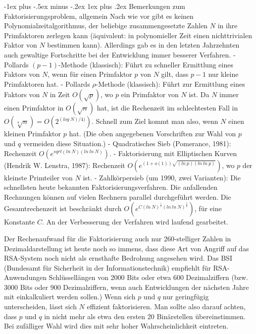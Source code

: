 \documentclass[a4paper]{article}
\makeatletter
\renewcommand{\subsubsection}{\@startsection{subsubsection}{3}{0mm}%
 {-1ex plus -.5ex minus -.2ex}%
 {1ex plus .2ex}%
 {\normalfont\small\bfseries}}
\makeatother
\begin{document}
\begin{multicols}{3}
        \subsubsection{Bemerkungen zum Faktorisierungsproblem, allgemein}
        Nach wie vor gibt es keinen Polynomialzeitalgorithmus, der beliebige zusammengesetzte Zahlen $N$ in ihre Primfaktoren zerlegen kann (äquivalent: in polynomieller
        Zeit einen nichttrivialen Faktor von $N$ bestimmen kann). Allerdings gab es in den letzten Jahrzehnten auch gewaltige Fortschritte bei der Entwicklung immer besserer Verfahren.
        - Pollards $(p-1)$-Methode (klassisch): Führt zu schneller Ermittlung eines Faktors von $N$, wenn für einen Primfaktor $p$ von $N$ gilt, dass $p-1$ nur kleine Primfaktoren hat.
        - Pollards ${\rho}$-Methode (klassisch): Führt zur Ermittlung eines Faktors von $N$ in Zeit $O(\sqrt{p})$, wo $p$ ein Primfaktor von $N$ ist. Da $N$ immer einen Primfaktor in $O(\sqrt{n})$ hat, ist die Rechenzeit im schlechtesten Fall in $O(\sqrt[4]{n}) =O(2^{(log\ N)/ 4)})$. Schnell zum Ziel kommt man also, wenn $N$ einen kleinen Primfaktor $p$ hat. (Die oben angegebenen Vorschriften zur Wahl von $p$ und $q$ vermeiden diese Situation.)
        - Quadratisches Sieb (Pomerance, 1981): Rechenzeit $O(e^{sqrt{(ln\ N)(ln\ ln\ N)}})$.
        - Faktorisierung mit Elliptischen Kurven (Hendrik W. Lenstra, 1987): Rechenzeit $O(e^{(1+o(1)) \sqrt{(ln\ p)(ln\ ln\ p)}})$, wo $p$ der kleinste Primteiler von $N$ ist.
        - Zahlkörpersieb (um 1990, zwei Varianten): Die schnellsten heute bekannten Faktorisierungsverfahren. Die anfallenden Rechnungen können auf vielen Rechnern parallel durchgeführt werden. Die Gesamtrechenzeit ist beschränkt durch $O(e^{C(ln\ N)^{\frac{1}{3}} (ln\ ln\ N)^{\frac{2}{3}}})$, für eine Konstante $C$. An der Verbesserung der Verfahren wird laufend gearbeitet.

        Der Rechenaufwand für die Faktorisierung auch nur 260-stelliger Zahlen in Dezimaldarstellung ist heute noch so immens, dass diese Art von Angriff auf das RSA-System noch nicht als ernsthafte Bedrohung angesehen wird. Das BSI (Bundesamt für Sicherheit in der Informationstechnik) empfiehlt für RSA-Anwendungen Schlüssellängen von 2000 Bits oder etwa 600 Dezimalziffern (bzw. 3000 Bits oder 900 Dezimalziffern, wenn auch Entwicklungen der nächsten Jahre mit einkalkuliert werden sollen.)
        Wenn sich $p$ und $q$ nur geringfügig unterscheiden, lässt sich $N$ effizient faktorisieren. Man sollte also darauf achten, dass $p$ und $q$ in nicht mehr als etwa den ersten 20 Binärstellen übereinstimmen. Bei zufälliger Wahl wird dies mit sehr hoher Wahrscheinlichkeit eintreten.


\end{multicols}
\end{document}
